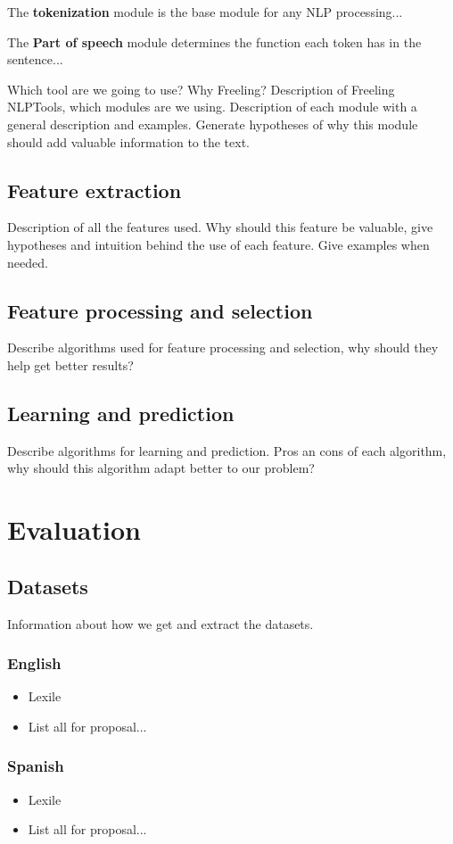 \documentclass[12pt]{article}
\begin{document}
The \textbf{tokenization} module is the base module for any NLP processing...

The \textbf{Part of speech} module determines the function each token has in the sentence...

Which tool are we going to use? Why Freeling? Description of Freeling NLPTools, which modules are we using. Description of each module with a general description and examples. Generate hypotheses of why this module should add valuable information to the text.

\subsection{Feature extraction}
Description of all the features used. Why should this feature be valuable, give hypotheses and intuition behind the use of each feature. Give examples when needed.

\subsection{Feature processing and selection}
Describe algorithms used for feature processing and selection, why should they help get better results?

\subsection{Learning and prediction}
Describe algorithms for learning and prediction. Pros an cons of each algorithm, why should this algorithm adapt better to our problem?

\section{Evaluation}

\subsection{Datasets}
Information about how we get and extract the datasets.
\subsubsection{English}
\begin{itemize}
\item Lexile
\item List all for proposal...
\end{itemize}
\subsubsection{Spanish}
\begin{itemize}
\item Lexile
\item List all for proposal...
\end{itemize}
\end{document}
